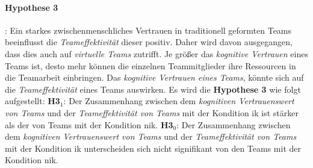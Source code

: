 \documentclass[a4paper,11pt]{article}%
\renewcommand{\\}{\vspace*{0.5\baselineskip} \newline}
\begin{document}
\paragraph{Hypothese 3}:
%
Ein starkes zwischenmenschliches Vertrauen in traditionell geformten Teams beeinflusst die \textit{Teameffektivität} dieser positiv. Daher wird davon ausgegangen, dass dies auch auf \textit{virtuelle Teams} zutrifft. 
Je größer das \textit{kognitive Vertrauen} eines Teams ist, desto mehr können die einzelnen Teammitglieder ihre Ressourcen in die Teamarbeit einbringen. 
Das \textit{kognitive Vertrauen eines Teams}, könnte sich auf die \textit{Teameffektivität} eines Teams auswirken. 
Es wird die \textbf{Hypothese 3} wie folgt aufgestellt:\\
\textbf{H3$_{1}$}: Der Zusammenhang zwischen dem \textit{kognitiven Vertrauenswert von Teams} und der \textit{Teameffektivität von Teams} mit der Kondition \ac{ik} ist stärker als der von Teams mit der Kondition \ac{nik}. \newline
\textbf{H3$_{0}$}: Der Zusammenhang zwischen dem \textit{kognitiven Vertrauenswert von Teams} und der \textit{Teameffektivität von Teams} mit der Kondition \ac{ik} unterscheiden sich nicht signifikant von den Teams mit der Kondition \ac{nik}. \\
%
\end{document}
